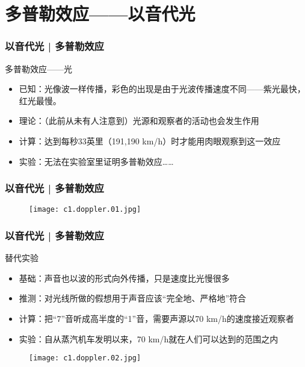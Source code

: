 \section{多普勒效应——以音代光}
\begin{frame}
  \frametitle{以音代光 | 多普勒效应}
  \begin{block}{多普勒效应——光}
    \begin{itemize}
      \item 已知：光像波一样传播，彩色的出现是由于光波传播速度不同——紫光最快，红光最慢。
      \item 理论：（此前从未有人注意到）光源和观察者的活动也会发生作用
      \item 计算：达到每秒33英里（191,190 km/h）时才能用肉眼观察到这一效应
      \item 实验：无法在实验室里证明多普勒效应……
    \end{itemize}
  \end{block}
\end{frame}

\begin{frame}
  \frametitle{以音代光 | 多普勒效应}
    \begin{figure}
      \centering
      \texttt{[image: c1.doppler.01.jpg]}
    \end{figure}
\end{frame}

\begin{frame}
  \frametitle{以音代光 | 多普勒效应}
  \begin{block}{替代实验}
    \begin{itemize}
      \item 基础：声音也以波的形式向外传播，只是速度比光慢很多
      \item 推测：对光线所做的假想用于声音应该“完全地、严格地”符合
      \item 计算：把“7”音听成高半度的“1”音，需要声源以70 km/h的速度接近观察者
      \item 实验：自从蒸汽机车发明以来，70 km/h就在人们可以达到的范围之内
    \end{itemize}
    \vspace{-1.5em}
    \begin{figure}
      \centering
      \texttt{[image: c1.doppler.02.jpg]}
    \end{figure}
  \end{block}
\end{frame}

